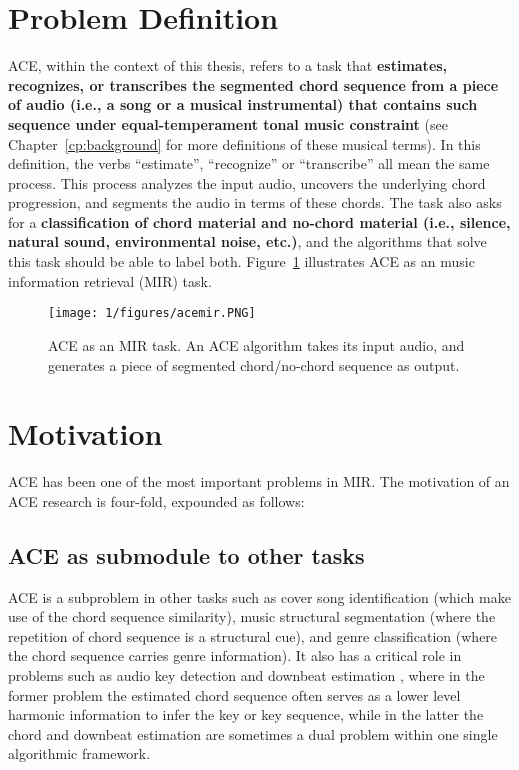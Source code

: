 \section{Problem Definition} \label{sec:1-problemdef}
ACE, within the context of this thesis, refers to a task that \textbf{estimates, recognizes, or transcribes the segmented chord sequence from a piece of audio (i.e., a song or a musical instrumental) that contains such sequence under equal-temperament tonal music constraint} (see Chapter~\ref{cp:background} for more definitions of these musical terms). In this definition, the verbs ``estimate'', ``recognize'' or ``transcribe'' all mean the same process. This process analyzes the input audio, uncovers the underlying chord progression, and segments the audio in terms of these chords. The task also asks for a \textbf{classification of chord material and no-chord material (i.e., silence, natural sound, environmental noise, etc.)}, and the algorithms that solve this task should be able to label both. Figure~\ref{fig:1-acemir} illustrates ACE as an music information retrieval (MIR) task.
\begin{figure}[h]
\centering
\texttt{[image: 1/figures/acemir.PNG]}
\caption{ACE as an MIR task. An ACE algorithm takes its input audio, and generates a piece of segmented chord/no-chord sequence as output.}
\label{fig:1-acemir}
\end{figure}

\section{Motivation} \label{sec:1-moti}
ACE has been one of the most important problems in MIR. The motivation of an ACE research is four-fold, expounded as follows:

\subsection{ACE as submodule to other tasks}
ACE is a subproblem in other tasks such as cover song identification \cite{bello2007audio,lee2006identifying,serra2010audio} (which make use of the chord sequence similarity), music structural segmentation \cite{bello2005robust} (where the repetition of chord sequence is a structural cue), and genre classification \cite{cheng2008automatic,perez2009genre} (where the chord sequence carries genre information). It also has a critical role in problems such as audio key detection \cite{papadopoulos2012modeling,pauwels2010integrating} and downbeat estimation \cite{papadopoulos2008simultaneous,mauch2010simultaneous}, where in the former problem the estimated chord sequence often serves as a lower level harmonic information to infer the key or key sequence, while in the latter the chord and downbeat estimation are sometimes a dual problem within one single algorithmic framework.

